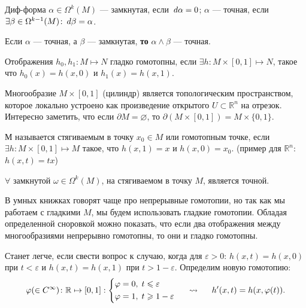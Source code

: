 \begin{to_def}
	Диф-форма $\alpha \in \Omega^k (M)$ --- замкнутая, если $\d \alpha = 0$; $\alpha$ --- точная, если $\exists \beta \in \Omega^{k-1} (M) \colon \d \beta = \alpha$.
	\label{def_7.9}
\end{to_def}

\begin{to_tas}
	Если $\alpha$ --- точная, а $\beta$ --- замкнутая, \textbf{то} $\alpha \wedge \beta$ --- точная.
	\label{tas_7.10}
\end{to_tas}

\begin{to_def}
	Отображения $h_0, h_1 \colon M \mapsto N$ гладко гомотопны, если $\exists h \colon M \times [0,1] \mapsto N$, такое что $h_0(x) = h(x,0)$ и $h_1(x) = h(x,1)$.
	\label{def_7.12}
\end{to_def}

Многообразие $M \times [0,1]$ (цилиндр) является топологическим пространством, которое локально устроено как произведение открытого $U\subset \mathbb{R}^n$ на отрезок.
Интересно заметить, что если $\partial M = \varnothing$, то $\partial(M \times [0,1]) = M \times \{0,1\}$. 

\begin{to_def}
	М называется стягиваемым в точку $x_0 \in M$ или гомотопным точке, если $\exists h \colon M \times [0,1] \mapsto M$ такое, что $h(x,1) = x$ и $h(x,0) = x_0$. (пример для $\mathbb{R}^n$: $h(x,t) = t x$)
\end{to_def}

\begin{to_thr}
	$\forall$ замкнутой $\omega \in \Omega^{k}(M)$,  на стягиваемом в точку $M$, является точной.
	\label{thr_poin}
\end{to_thr}

В умных книжках говорят чаще про непрерывные гомотопии, но так как мы работаем с гладкими $M$, мы будем использовать гладкие гомотопии. Обладая определенной сноровкой можно показать, что если два отображения между многообразиями непрерывно гомотопны, то они и гладко гомотопны.

Станет легче, если свести вопрос к случаю, когда для $\varepsilon > 0$: $h(x,t) = h(x,0)$ при $t < \varepsilon$ и $h(x,t) = h(x,1)$ при $t > 1-\varepsilon$.
Определим новую гомотопию:
\begin{equation*}
\varphi(\in C^\infty) \colon \mathbb{R} \mapsto [0,1]:
\left\{
\begin{aligned}
	&\varphi = 0,\; t \leq \varepsilon\\
	&\varphi = 1,\; t \geq 1-\varepsilon
\end{aligned}
\right.
\hspace*{0.5 cm}  \leadsto \hspace*{0.5 cm}
	h'(x,t)=h(x,\varphi(t)).
\end{equation*} 

